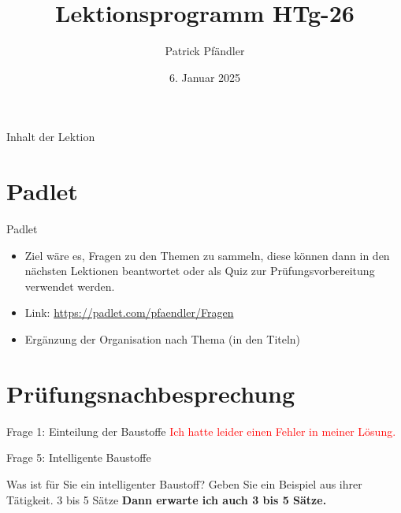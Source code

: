 



\title{\textbf{Lektionsprogramm HTg-26}}
\author{Patrick Pfändler}
\date{6. Januar 2025}




\frame{\titlepage}

\begin{frame}{Inhalt der Lektion}
    \tableofcontents
\end{frame}


\section{Padlet}
\BlueSectionSlide
\begin{frame}{Padlet}
    \begin{itemize}
        \item[\textbullet] Ziel wäre es, Fragen zu den Themen zu sammeln, diese können dann in den nächsten Lektionen beantwortet oder als Quiz zur Prüfungsvorbereitung verwendet werden.
        \item[\textbullet] Link: \url{https://padlet.com/pfaendler/Fragen}
        \item[\textbullet] Ergänzung der Organisation nach Thema (in den Titeln)
    \end{itemize}
\end{frame}


\section{Prüfungsnachbesprechung}
\BlueSectionSlide


\begin{frame}{Frage 1: Einteilung der Baustoffe}
    \textcolor{red}{Ich hatte leider einen Fehler in meiner Lösung.}
\end{frame}

\begin{frame}{Frage 5: Intelligente Baustoffe}
    \begin{block}{Was ist für Sie ein intelligenter Baustoff? Geben Sie ein Beispiel aus ihrer Tätigkeit. 3 bis 5 Sätze}
        \textbf{Dann erwarte ich auch 3 bis 5 Sätze.}
    \end{block}
\end{frame}

